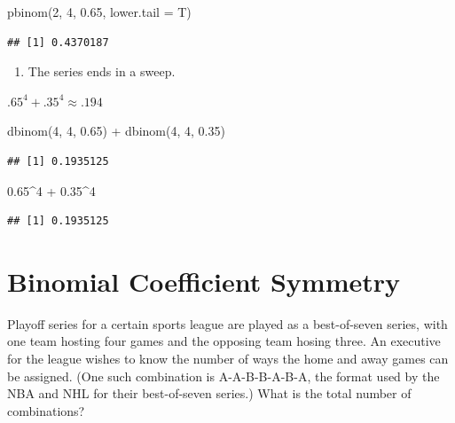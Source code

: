 \documentclass[
  11pt,
]{book}
\newenvironment{Shaded}{\begin{snugshade}}{\end{snugshade}}
\newcommand{\AttributeTok}[1]{\textcolor[rgb]{0.77,0.63,0.00}{#1}}
\newcommand{\DecValTok}[1]{\textcolor[rgb]{0.00,0.00,0.81}{#1}}
\newcommand{\FloatTok}[1]{\textcolor[rgb]{0.00,0.00,0.81}{#1}}
\newcommand{\FunctionTok}[1]{\textcolor[rgb]{0.00,0.00,0.00}{#1}}
\newcommand{\NormalTok}[1]{#1}
\newcommand{\SpecialCharTok}[1]{\textcolor[rgb]{0.00,0.00,0.00}{#1}}
\providecommand{\tightlist}{%
  \setlength{\itemsep}{0pt}\setlength{\parskip}{0pt}}
\theoremstyle{definition}
\theoremstyle{definition}
\theoremstyle{definition}
\theoremstyle{definition}
\theoremstyle{remark}
\begin{document}
\begin{Shaded}
\begin{Highlighting}[]
\FunctionTok{pbinom}\NormalTok{(}\DecValTok{2}\NormalTok{, }\DecValTok{4}\NormalTok{, }\FloatTok{0.65}\NormalTok{, }\AttributeTok{lower.tail =}\NormalTok{ T)}
\end{Highlighting}
\end{Shaded}

\begin{verbatim}
## [1] 0.4370187
\end{verbatim}

\begin{enumerate}
\def\labelenumi{(\alph{enumi})}
\setcounter{enumi}{3}
\tightlist
\item
  The series ends in a sweep.
\end{enumerate}

\(.65^4 + .35^4 \approx .194\)

\begin{Shaded}
\begin{Highlighting}[]
\FunctionTok{dbinom}\NormalTok{(}\DecValTok{4}\NormalTok{, }\DecValTok{4}\NormalTok{, }\FloatTok{0.65}\NormalTok{) }\SpecialCharTok{+} \FunctionTok{dbinom}\NormalTok{(}\DecValTok{4}\NormalTok{, }\DecValTok{4}\NormalTok{, }\FloatTok{0.35}\NormalTok{)}
\end{Highlighting}
\end{Shaded}

\begin{verbatim}
## [1] 0.1935125
\end{verbatim}

\begin{Shaded}
\begin{Highlighting}[]
\FloatTok{0.65}\SpecialCharTok{\^{}}\DecValTok{4} \SpecialCharTok{+} \FloatTok{0.35}\SpecialCharTok{\^{}}\DecValTok{4}
\end{Highlighting}
\end{Shaded}

\begin{verbatim}
## [1] 0.1935125
\end{verbatim}

\hypertarget{binomial-coefficient-symmetry-1}{%
\section{Binomial Coefficient Symmetry}\label{binomial-coefficient-symmetry-1}}

Playoff series for a certain sports league are played as a best-of-seven series, with one team hosting four games and the opposing team hosing three. An executive for the league wishes to know the number of ways the home and away games can be assigned. (One such combination is A-A-B-B-A-B-A, the format used by the NBA and NHL for their best-of-seven series.) What is the total number of combinations?
\end{document}
